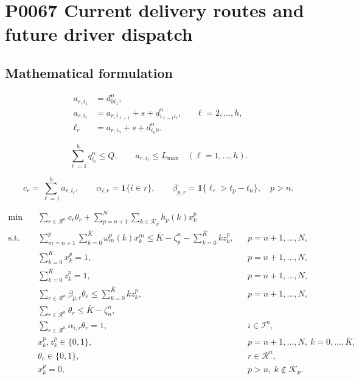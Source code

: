 \documentclass[10pt]{article}
\begin{document}
\section*{P0067 Current delivery routes and future driver dispatch}
\subsection*{Mathematical formulation}
\begin{align}
a_{r,i_1}&=d_{0i_1}^n,\nonumber\\
a_{r,i_\ell}&=a_{r,i_{\ell-1}}+s+d_{i_{\ell-1}i_\ell}^n,
&&\ell=2,\ldots,h,\tag{D1}\\
\ell_r&=a_{r,i_h}+s+d_{i_h0}^n.\tag{D2}
\end{align}

\begin{equation}
\sum_{\ell=1}^h q_{i_\ell}^n\le Q,\qquad
 a_{r,i_\ell}\le L_{\max}\quad(\ell=1,\ldots,h).\tag{D3}
\end{equation}

\begin{equation}
c_r=\sum_{\ell=1}^h a_{r,i_\ell},\qquad
\alpha_{i,r}=\mathbf1\{i\in r\},\qquad
\beta_{p,r}=\mathbf1\{\ell_r>t_p-t_n\},\quad p>n.\tag{D4}
\end{equation}

\begin{align}
\min\quad&\sum_{r\in\mathcal R^n}c_r\theta_r+
\sum_{p=n+1}^N\sum_{k\in\mathcal K_p}h_p(k)x_k^p\tag{14}\\
\text{s.t.}\quad&
\sum_{m=n+1}^{p}\sum_{k=0}^{\bar K}\omega_m^p(k)x_k^m
\le\bar K-\zeta_p^n-\sum_{k=0}^{\bar K}kz_k^p,
&&p=n+1,\ldots,N,\tag{15}\\
&\sum_{k=0}^{\bar K}x_k^p=1,
&&p=n+1,\ldots,N,\tag{16}\\
&\sum_{k=0}^{\bar K}z_k^p=1,
&&p=n+1,\ldots,N,\tag{17}\\
&\sum_{r\in\mathcal R^n}\beta_{p,r}\theta_r
\le\sum_{k=0}^{\bar K}kz_k^p,
&&p=n+1,\ldots,N,\tag{18}\\
&\sum_{r\in\mathcal R^n}\theta_r\le\bar K-\zeta_n^n,\tag{19}\\
&\sum_{r\in\mathcal R^n}\alpha_{i,r}\theta_r=1,
&&i\in\mathcal I^n,\tag{20}\\
&x_k^p,z_k^p\in\{0,1\},
&&p=n+1,\ldots,N,\ k=0,\ldots,\bar K,\tag{21}\\
&\theta_r\in\{0,1\},&&r\in\mathcal R^n,\tag{22}\\
&x_k^p=0,&&p>n,\ k\notin\mathcal K_p.\tag{finite}
\end{align}
\end{document}
